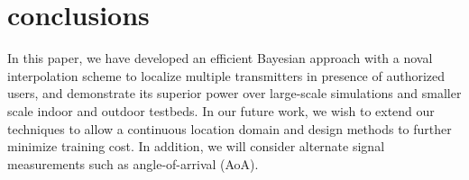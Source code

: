 \section{conclusions}

In this paper, we have developed an efficient Bayesian approach with a noval interpolation scheme to
localize multiple transmitters in presence of authorized users, and
demonstrate its superior power over large-scale simulations and smaller
scale indoor and outdoor testbeds.
In our future work, we wish to extend our techniques to allow a
continuous location domain and design methods to further minimize
training cost. In addition, we will consider alternate signal
measurements such as angle-of-arrival (AoA).




